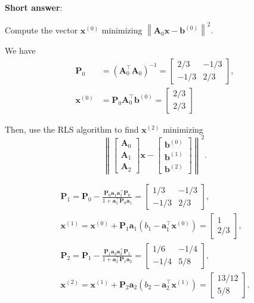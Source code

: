 \textbf{Short answer}:

Compute the vector \(\boldsymbol{x}^{(0)}\) minimizing \(\left\|\boldsymbol{A}_0 \boldsymbol{x}-\boldsymbol{b}^{(0)}\right\|^2\). 

We have
\[
\begin{aligned}
	\boldsymbol{P}_0 & =\left(\boldsymbol{A}_0^{\top} \boldsymbol{A}_0\right)^{-1}=\left[\begin{array}{cc}
		2 / 3 & -1 / 3 \\
		-1 / 3 & 2 / 3
	\end{array}\right], \\
	\boldsymbol{x}^{(0)} & =\boldsymbol{P}_0 \boldsymbol{A}_0^{\top} \boldsymbol{b}^{(0)}=\left[\begin{array}{c}
		2 / 3 \\
		2 / 3
	\end{array}\right]
\end{aligned}
\]

Then, use the RLS algorithm to find \(\boldsymbol{x}^{(2)}\) minimizing
\[
\left\|\left[\begin{array}{l}
	\boldsymbol{A}_0 \\
	\boldsymbol{A}_1 \\
	\boldsymbol{A}_2
\end{array}\right] \boldsymbol{x}-\left[\begin{array}{l}
	\boldsymbol{b}^{(0)} \\
	\boldsymbol{b}^{(1)} \\
	\boldsymbol{b}^{(2)}
\end{array}\right]\right\|^2 .
\]

\[
\begin{gathered}
	\boldsymbol{P}_1=\boldsymbol{P}_0-\frac{\boldsymbol{P}_0 \boldsymbol{a}_1 \boldsymbol{a}_1^{\top} \boldsymbol{P}_0}{1+\boldsymbol{a}_1^{\top} \boldsymbol{P}_0 \boldsymbol{a}_1}=\left[\begin{array}{cc}
		1 / 3 & -1 / 3 \\
		-1 / 3 & 2 / 3
	\end{array}\right], \\
	\boldsymbol{x}^{(1)}=\boldsymbol{x}^{(0)}+\boldsymbol{P}_1 \boldsymbol{a}_1\left(b_1-\boldsymbol{a}_1^{\top} \boldsymbol{x}^{(0)}\right)=\left[\begin{array}{c}
		1 \\
		2 / 3
	\end{array}\right], \\
	\boldsymbol{P}_2=\boldsymbol{P}_1-\frac{\boldsymbol{P}_1 \boldsymbol{a}_2 \boldsymbol{a}_2^{\top} \boldsymbol{P}_1}{1+\boldsymbol{a}_2^{\top} \boldsymbol{P}_1 \boldsymbol{a}_2}=\left[\begin{array}{cc}
		1 / 6 & -1 / 4 \\
		-1 / 4 & 5 / 8
	\end{array}\right], \\
	\boldsymbol{x}^{(2)}=\boldsymbol{x}^{(1)}+\boldsymbol{P}_2 \boldsymbol{a}_2\left(b_2-\boldsymbol{a}_2^{\top} \boldsymbol{x}^{(1)}\right)=\left[\begin{array}{c}
		13 / 12 \\
		5 / 8
	\end{array}\right] .
\end{gathered}
\]

